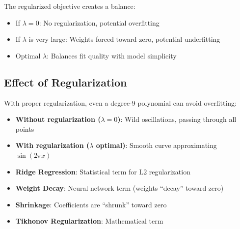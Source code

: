 The regularized objective creates a balance:

\begin{center}
\end{center}

\begin{itemize}
    \item If $\lambda = 0$: No regularization, potential overfitting
    \item If $\lambda$ is very large: Weights forced toward zero, potential underfitting
    \item Optimal $\lambda$: Balances fit quality with model simplicity
\end{itemize}

\subsection{Effect of Regularization}

With proper regularization, even a degree-9 polynomial can avoid overfitting:

\begin{itemize}
    \item \textbf{Without regularization ($\lambda = 0$)}: Wild oscillations, passing through all points
    \item \textbf{With regularization ($\lambda$ optimal)}: Smooth curve approximating $\sin(2\pi x)$
\end{itemize}

\begin{bluebox}
\begin{itemize}
    \item \textbf{Ridge Regression}: Statistical term for L2 regularization
    \item \textbf{Weight Decay}: Neural network term (weights ``decay'' toward zero)
    \item \textbf{Shrinkage}: Coefficients are ``shrunk'' toward zero
    \item \textbf{Tikhonov Regularization}: Mathematical term
\end{itemize}
\end{bluebox}

